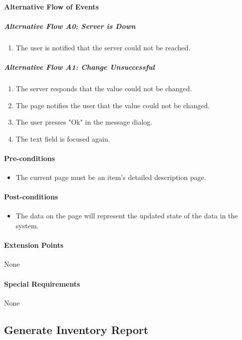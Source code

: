 \documentclass{article}
\begin{document}
\paragraph{Alternative Flow of Events}

\subparagraph{Alternative Flow A0: Server is Down}
\begin{enumerate}
\item The user is notified that the server could not be reached.
\end{enumerate}

\subparagraph{Alternative Flow A1: Change Unsuccessful}
\begin{enumerate}
\item The server responds that the value could not be changed.
\item The page notifies the user that the value could not be changed.
\item The user presses "Ok" in the message dialog.
\item The text field is focused again.
\end{enumerate}

\paragraph{Pre-conditions}
\begin{itemize}
\item The current page must be an item's detailed description page.
\end{itemize}

\paragraph{Post-conditions}
\begin{itemize}
\item The data on the page will represent the updated state of the data in the system.
\end{itemize}

\paragraph{Extension Points}
None

\paragraph{Special Requirements}
None

\subsection{Generate Inventory Report}
\end{document}
